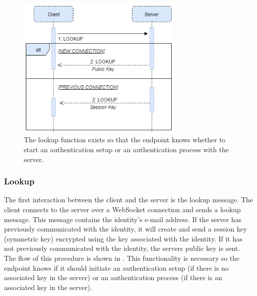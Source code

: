 	\paragraph{}
	\begin{figure}[th]
	  \centering
	  \includegraphics[width=80mm]{Figures/ACS_Prot/Connect}
	  \decoRule
	  \caption[WS protocol: Lookup function]{The lookup function exists so that the endpoint knows whether to start an authentication setup or an authentication process with the server.}
	  \label{fig:prot_lookup}
	\end{figure}

	\subsubsection*{Lookup}
	The first interaction between the client and the server is the lookup message. The client connects to the server over a WebSocket connection and sends a lookup message. This message contains the identity's e-mail address. If the server has previously communicated with the identity, it will create and send a session key (symmetric key) encrypted using the key associated with the identity. If it has not previously communicated with the identity, the servers public key is sent.%
	The flow of this procedure is shown in . This functionality is necessary so the endpoint knows if it should initiate an authentication setup (if there is no associated key in the server) or an authentication process (if there is an associated key in the server).

